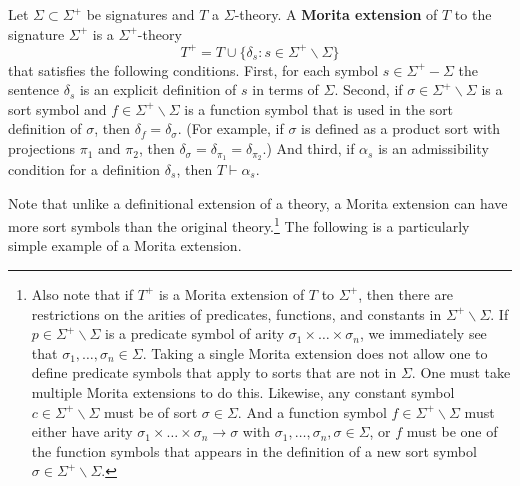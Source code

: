 \begin{defn} Let $\Sigma\subset\Sigma^+$ be signatures and $T$ a
  $\Sigma$-theory. A \textbf{Morita extension} of $T$ to the signature
  $\Sigma^+$ is a $\Sigma^+$-theory
\[  T^+=T\cup\{\delta_s:s\in\Sigma^+\backslash\Sigma\} \] 
that satisfies the following conditions. First, for each symbol
$s\in\Sigma^+-\Sigma$ the sentence $\delta_s$ is an explicit
definition of $s$ in terms of $\Sigma$. Second, if
$\sigma\in\Sigma^+\backslash\Sigma$ is a sort symbol and
$f\in \Sigma^+\backslash\Sigma$ is a function symbol that is used in
the sort definition of $\sigma$, then $\delta_f=\delta_\sigma$. (For
example, if $\sigma$ is defined as a product sort with projections
$\pi_1$ and $\pi_2$, then
$\delta_\sigma=\delta_{\pi_1}=\delta_{\pi_2}$.)
And third, if $\alpha_s$ is an admissibility condition for a
definition $\delta_s$, then $T\vdash\alpha_s$. \end{defn}

Note that unlike a definitional extension of a theory, a Morita
extension can have more sort symbols than the original
theory.\footnote{Also note that if $T^+$ is a Morita extension of $T$
  to $\Sigma^+$, then there are restrictions on the arities of
  predicates, functions, and constants in
  $\Sigma^+\backslash\Sigma$. If $p\in\Sigma^+\backslash\Sigma$ is a
  predicate symbol of arity $\sigma_1\times\ldots\times\sigma_n$, we
  immediately see that $\sigma_1,\ldots,\sigma_n\in\Sigma$. Taking a
  single Morita extension does not allow one to define predicate
  symbols that apply to sorts that are not in $\Sigma$. One must take
  multiple Morita extensions to do this.  Likewise, any constant
  symbol $c\in\Sigma^+\backslash\Sigma$ must be of sort
  $\sigma\in\Sigma$. And a function symbol
  $f\in\Sigma^+\backslash\Sigma$ must either have arity
  $\sigma_1\times\ldots\times\sigma_n\rightarrow\sigma$ with
  $\sigma_1,\ldots,\sigma_n,\sigma\in\Sigma$, or $f$ must be one of
  the function symbols that appears in the definition of a new sort
  symbol $\sigma\in\Sigma^+\backslash\Sigma$.} The following is a
particularly simple example of a Morita extension.

